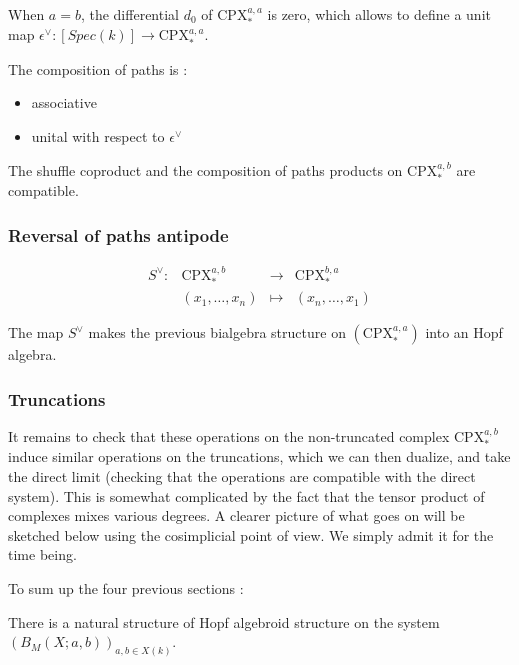 When $a=b$, the differential $d_0$ of $\mathrm{CPX}_*^{a,a}$ is zero, which allows to define a unit map $\epsilon^\vee:[Spec(k)]\rightarrow \mathrm{CPX}_*^{a,a}$.

\begin{lemma}
The composition of paths is :
\begin{itemize}
\item associative
\item unital with respect to $\epsilon^\vee$
\end{itemize}
\end{lemma}

\begin{lemma}
The shuffle coproduct and the composition of paths products on $\mathrm{CPX}_*^{a,b}$ are compatible.
\end{lemma}

\subsubsection{Reversal of paths antipode}
\[
\begin{array}{cccc}
S^{\vee}: & \mathrm{CPX}_*^{a,b}&\to & \mathrm{CPX}_*^{b,a}\\
& (x_1,\ldots,x_n) & \mapsto & (x_n,\ldots,x_1)
\end{array}
\]

\begin{lemma}
The map $S^{\vee}$ makes the previous bialgebra structure on $(\mathrm{CPX}_*^{a,a})$ into an Hopf algebra.
\end{lemma}

\subsubsection{Truncations}
It remains to check that these operations on the non-truncated complex $\mathrm{CPX}_*^{a,b}$ induce similar operations on the truncations, which we can then dualize, and take the direct limit (checking that the operations are compatible with the direct system). This is somewhat complicated by the fact that the tensor product of complexes mixes various degrees. A clearer picture of what goes on will be sketched below using the cosimplicial point of view. We simply admit it for the time being.

To sum up the four previous sections :

\begin{prop}
There is a natural structure of Hopf algebroid structure on the system $(B_M(X;a,b))_{a,b\in X(k)}$.
\end{prop}

